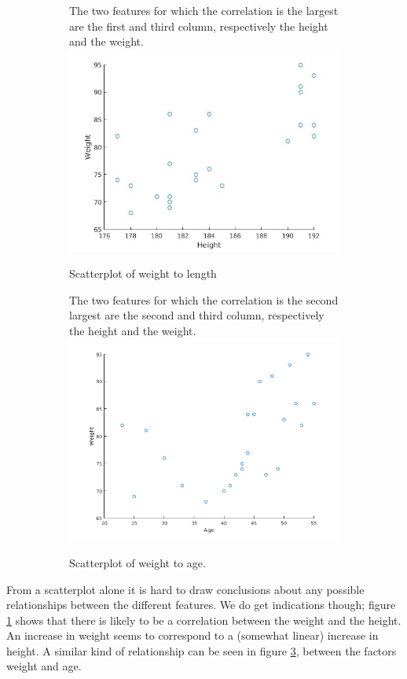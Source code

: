 \documentclass[10pt]{article}
\begin{document}
\begin{figure}[H]
	\centering

	\begin{subfigure}[b]{.45\linewidth}
		The two features for which the correlation is the largest are the first and third column, respectively the height and the weight.
		\centering
		\includegraphics[width=\columnwidth]{plot_1_3_a.jpg}
		\caption{Scatterplot of weight to length}
		\label{fig1.3a}
	\end{subfigure}%
	\quad
	\begin{subfigure}[b]{.45\linewidth}
		The two features for which the correlation is the second largest are the second and third column, respectively the height and the weight.
		\centering
		\includegraphics[width=\linewidth]{plot_1_3_b.png}
		\caption{Scatterplot of weight to age.}
		\label{fig1.3b}
	\end{subfigure}
	\caption{}
\end{figure}
From a scatterplot alone it is hard to draw conclusions about any possible relationships between the different features. 
We do get indications though; figure \ref{fig1.3a} shows that there is likely to be a correlation between the weight and the height.
An increase in weight seems to correspond to a (somewhat linear) increase in height. 
A similar kind of relationship can be seen in figure \ref{fig1.3b}, between the factors weight and age.
\end{document}

